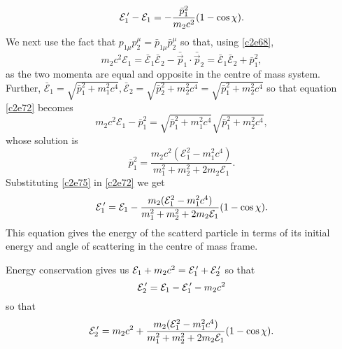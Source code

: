 \begin{enumerate}
\begin{equation}
\mathcal{E}_1^{\,\prime} - \mathcal{E}_1 = -\frac{\bar{p}_1^2}{m_2c^2}(1 - \cos\chi).
\end{equation}
We next use the fact that $p_{1\mu}p_2^\mu = \bar{p}_{1\mu}\bar{p}_2^\mu$ so 
that, using \eqref{c2e68},
\begin{equation}\label{c2e73}
m_2c^2\mathcal{E}_1 = \bar{\mathcal{E}}_1\bar{\mathcal{E}}_2 - 
\bar{\vec{p}}_1\cdot\bar{\vec{p}}_2 = 
\bar{\mathcal{E}}_1\bar{\mathcal{E}}_2 + \bar{p}_1^2,
\end{equation}
as the two momenta are equal and opposite in the centre of mass system. Further,
$\bar{\mathcal{E}}_1 = \sqrt{\bar{p}_1^2 + m_1^2c^4}, \bar{\mathcal{E}}_2 = 
\sqrt{\bar{p}_2^2 + m_2^2c^4}
= \sqrt{\bar{p}_1^2 + m_2^2c^4}$ so that equation \eqref{c2e72} becomes
\begin{equation}\label{c2e74}
m_2c^2\mathcal{E}_1 - \bar{p}_1^2 = \sqrt{\bar{p}_1^2 + m_1^2c^4}
\sqrt{\bar{p}_1^2 + m_2^2c^4},
\end{equation}
whose solution is
\begin{equation}\label{c2e75}
\bar{p}_1^2 = 
\frac{m_2c^2(\mathcal{E}_1^2 - m_1^2c^4)}{m_1^2 + m_2^2 + 2m_2\mathcal{E}_1}.
\end{equation}
Substituting \eqref{c2e75} in \eqref{c2e72} we get
\begin{equation}\label{c2e76}
\mathcal{E}_1^{\,\prime} = \mathcal{E}_1 - 
\frac{m_2(\mathcal{E}_1^2 - m_1^2c^4)}
{m_1^2 + m_2^2 + 2m_2\mathcal{E}_1}(1 - \cos\chi).
\end{equation}
This equation gives the energy of the scatterd particle in terms of its initial
energy and angle of scattering in the centre of mass frame.

Energy conservation gives us $\mathcal{E}_1 + m_2c^2 = \mathcal{E}_1^{\,\prime} + 
\mathcal{E}_2^{\,\prime}$ so that
\[
\mathcal{E}_2^{\,\prime} = \mathcal{E}_1 - \mathcal{E}_1^{\,\prime} - m_2c^2
\]
so that
\begin{equation}\label{c2e77}
\mathcal{E}_2^{\,\prime} = m_2c^2 + 
\frac{m_2(\mathcal{E}_1^2 - m_1^2c^4)}{m_1^2 + m_2^2 + 2m_2\mathcal{E}_1}
(1 - \cos\chi).
\end{equation}


\end{enumerate}
